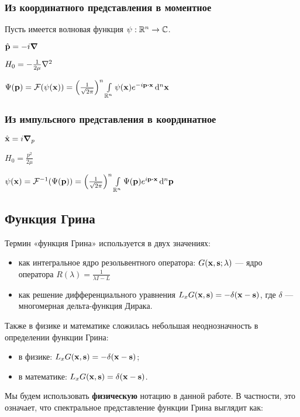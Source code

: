 \subsubsection{Из координатного представления в моментное}
Пусть имеется волновая функция $\psi: \mathbb{R}^n \to \mathbb{C}$. 

$\hat{\vb{p}} = -i \grad$

$H_0 = - \frac{1}{2 \mu} \laplacian$

$\Psi(\vb{p}) = \mcF(\psi(\vb{x})) = \left(\frac{1}{\sqrt{2 \pi}}\right)^n \int\limits_{\bbR^n} \psi(\vb{x}) e^{-i \vb{p} \vdot \vb{x}} \dd[n]{\vb{x}}$

\subsubsection{Из импульсного представления в координатное}

$\hat{\vb{x}} = i \grad_p$

$H_0 = \frac{p^2}{2 \mu}$

$\psi(\vb{x}) = \mcF^{-1}(\Psi(\vb{p})) = \left(\frac{1}{\sqrt{2 \pi}}\right)^n \int\limits_{\bbR^n} \Psi(\vb{p}) e^{i \vb{p} \vdot \vb{x}} \dd[n]{\vb{p}}$

\subsection{Функция Грина}
Термин «функция Грина» используется в двух значениях:

\begin{itemize}
\item как интегральное ядро резольвентного оператора: $G(\vb{x}, \vb{s}; \lambda)$ — ядро оператора $R(\lambda) = \frac{1}{\lambda I - L}$ 
\item как решение дифференциального уравнения $L_x G(\vb{x}, \vb{s}) = -\delta(\vb{x} - \vb{s})$, где $\delta$ — многомерная дельта-функция Дирака.
\end{itemize}

Также в физике и математике сложилась небольшая неоднозначность в определении функции Грина:

\begin{itemize}
\item в физике: $L_x G(\vb{x}, \vb{s}) = -\delta(\vb{x} - \vb{s})$;
\item в математике: $L_x G(\vb{x}, \vb{s}) = \delta(\vb{x} - \vb{s})$.
\end{itemize} 

Мы будем использовать \textbf{физическую} нотацию в данной работе. В частности, это означает, что спектральное представление функции Грина выглядит как: 

